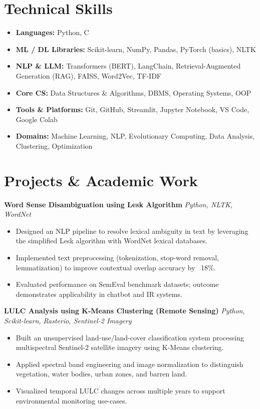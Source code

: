 \documentclass[10.5pt,a4paper]{article}
\begin{document}
\section*{Technical Skills}
\begin{itemize}[leftmargin=14pt, topsep=2pt, itemsep=2pt]
    \item \textbf{Languages:} Python, C
    \item \textbf{ML / DL Libraries:} Scikit-learn, NumPy, Pandas, PyTorch (basics), NLTK
    \item \textbf{NLP \& LLM:} Transformers (BERT), LangChain, Retrieval-Augmented Generation (RAG), FAISS, Word2Vec, TF-IDF
    \item \textbf{Core CS:} Data Structures \& Algorithms, DBMS, Operating Systems, OOP
    \item \textbf{Tools \& Platforms:} Git, GitHub, Streamlit, Jupyter Notebook, VS Code, Google Colab
    \item \textbf{Domains:} Machine Learning, NLP, Evolutionary Computing, Data Analysis, Clustering, Optimization
\end{itemize}

\section*{Projects \& Academic Work}

\textbf{Word Sense Disambiguation using Lesk Algorithm} \hfill \textit{Python, NLTK, WordNet}
\begin{itemize}
    \item Designed an NLP pipeline to resolve lexical ambiguity in text by leveraging the simplified Lesk algorithm with WordNet lexical databases.
    \item Implemented text preprocessing (tokenization, stop-word removal, lemmatization) to improve contextual overlap accuracy by ~18\%.
    \item Evaluated performance on SemEval benchmark datasets; outcome demonstrates applicability in chatbot and IR systems.
\end{itemize}

\vspace{2pt}
\textbf{LULC Analysis using K-Means Clustering (Remote Sensing)} \hfill \textit{Python, Scikit-learn, Rasterio, Sentinel-2 Imagery}
\begin{itemize}
    \item Built an unsupervised land-use/land-cover classification system processing multispectral Sentinel-2 satellite imagery using K-Means clustering.
    \item Applied spectral band engineering and image normalization to distinguish vegetation, water bodies, urban zones, and barren land.
    \item Visualized temporal LULC changes across multiple years to support environmental monitoring use-cases.
\end{itemize}
\end{document}
